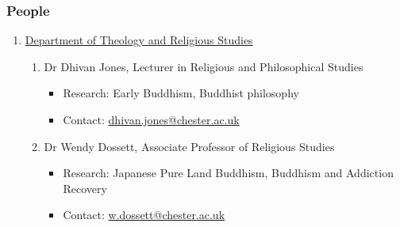 \documentclass[a4paper,10.5pt]{article}
\begin{document}
\subsubsection{People}
\label{sec:orgc6e406b}
\begin{enumerate}
\item \href{https://www1.chester.ac.uk/departments/theology-and-religious-studies}{Department of Theology and Religious Studies}
\label{sec:orgc80c22b}
\begin{enumerate}
\item Dr Dhivan Jones, Lecturer in Religious and Philosophical Studies
\label{sec:orgbae9f98}
\begin{itemize}
\item Research: Early Buddhism, Buddhist philosophy\\
\item Contact: \href{mailto:dhivan.jones@chester.ac.uk}{dhivan.jones@chester.ac.uk}\\
\end{itemize}
\item Dr Wendy Dossett, Associate Professor of Religious Studies
\label{sec:orga2d5eb4}
\begin{itemize}
\item Research: Japanese Pure Land Buddhism, Buddhism and Addiction Recovery\\
\item Contact: \href{mailto:w.dossett@chester.ac.uk}{w.dossett@chester.ac.uk}\\
\end{itemize}
\end{enumerate}
\end{enumerate}
\end{document}
